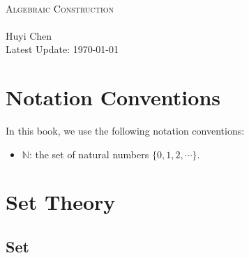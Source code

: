 \documentclass{report}
\begin{document}
\begin{center}
	~\\
	\vspace{6em}
	{\fontsize{34}{48}\selectfont\textsc{Algebraic Construction}}
	~\\
	\vspace{2.5em}
	{\Large }
	~\\
	\vspace{6em}
	\textsf{\Large Huyi Chen}
	~\\
	\vspace{5in}
	{\large Latest Update: \today}
\end{center}

\makeatletter
\MHInternalSyntaxOn
\def\MT_leftarrow_fill:{%
  \arrowfill@\leftarrow\relbar\relbar}
\def\MT_rightarrow_fill:{%
  \arrowfill@\relbar\relbar\rightarrow}
\newcommand{\xrightleftarrows}[2][]{\mathrel{%
  \raise.55ex\hbox{%
    $\ext@arrow 0359\MT_rightarrow_fill:{\phantom{#1}}{#2}$}%
  \setbox0=\hbox{%
    $\ext@arrow 3095\MT_leftarrow_fill:{#1}{\phantom{#2}}$}%
  \kern-\wd0 \lower.55ex\box0}}
\MHInternalSyntaxOff
\makeatother
\newcommand{\spec}{\operatorname{Spec}}
\newcommand{\midv}{\,\middle\vert\,}
\newpage
\tableofcontents


\chapter*{Notation Conventions}

In this book, we use the following notation conventions:
\begin{itemize}
    \item $\mathbb{N}$: the set of natural numbers $\{0,1,2,\cdots\}$.
\end{itemize}

\chapter{Set Theory}
\section{Set}
\end{document}
